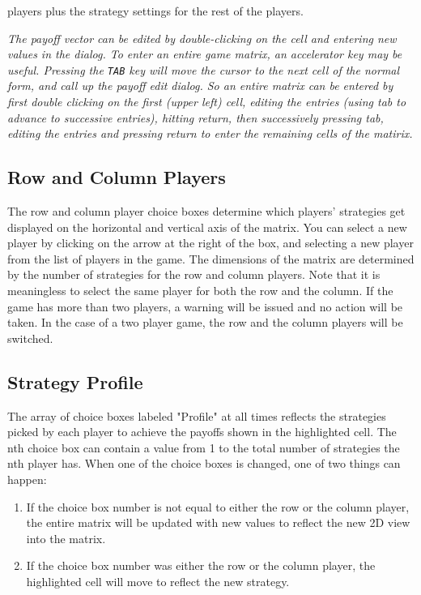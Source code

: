 players plus the strategy settings for the rest of the players.  {\em The
payoff vector can be edited by double-clicking on the cell and entering
new values in the dialog. To enter an entire game matrix, an accelerator
key may be useful.  Pressing the {\tt TAB} key will move the cursor to the 
next cell of the normal form, and call up the payoff edit dialog. So an entire 
matrix can be entered by first double clicking on the first (upper left) cell, 
editing the entries (using tab to advance to successive entries), hitting 
return, then successively pressing tab, editing the entries and pressing return 
to enter the remaining cells of the matirix.  

\subsection{Row and Column Players} The row and column player choice boxes
determine which players' strategies get displayed on the horizontal and
vertical axis of the matrix.  You can select a new player by clicking on the 
arrow at the right of the box, and selecting a new player from the 
list of players in the game.  The dimensions of the matrix are
determined by the number of strategies for the row and column players.
Note that it is meaningless to select the same player for both the row and
the column.  If the game has more than two players, a warning will be
issued and no action will be taken.  In the case of a two player game, the
row and the column players will be switched.

\subsection{Strategy Profile}
The array of choice boxes labeled "Profile" at all times reflects the
strategies picked by each player to achieve the payoffs shown in the
highlighted cell.  The nth choice box can contain a value from 1 to the
total number of strategies the nth player has.  When one of the choice
boxes is changed, one of two things can happen:
\begin{enumerate}
\item If the choice box number is not equal to either the row or
the column player, the entire matrix will be updated with new values to
reflect the new 2D view into the matrix.
\item If the choice box number was either the row or the column player,
the highlighted cell will move to reflect the new strategy.
\end{enumerate}

}
